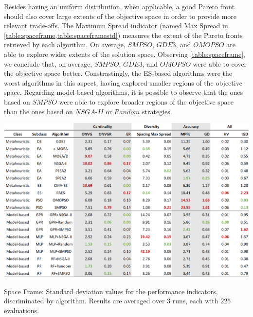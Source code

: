 Besides having an uniform distribution, when applicable, a good Pareto front should also cover large extents of the objective space in order to provide more relevant trade-offs. The Maximum Spread indicator (named Max Spread in \cref{table:spaceframe,table:spaceframestd}) measures the extent of the Pareto fronts retrieved by each algorithm. On average, $SMPSO$, $GDE3$, and $OMOPSO$ are able to explore wider extents of the solution space. Observing \cref{table:spaceframe}, we conclude that, on average, $SMPSO$, $GDE3$, and $OMOPSO$ were able to cover the objective space better. Constrastingly, the \ac{ES}-based algorithms were the worst algorithms in this aspect, having explored smaller regions of the objective space. Regarding model-based algorithms, it is possible to observe that the ones based on $SMPSO$ were able to explore broader regions of the objective space than the ones based on $NSGA$-$II$ or $Random$ strategies. 

\begin{table}[h!]
	\centering
	\includegraphics[width=\textwidth]{Images/Evaluation/caadria/Results_Std_20190416.PNG}
	\caption[Space Frame: Standard deviations of the performance indicators results, discriminated by each algorithm]{Space Frame: Standard deviation values for the performance indicators, discriminated by algorithm. Results are averaged over $3$ runs, each with $225$ evaluations.}
	\label{table:spaceframestd}
\end{table}

